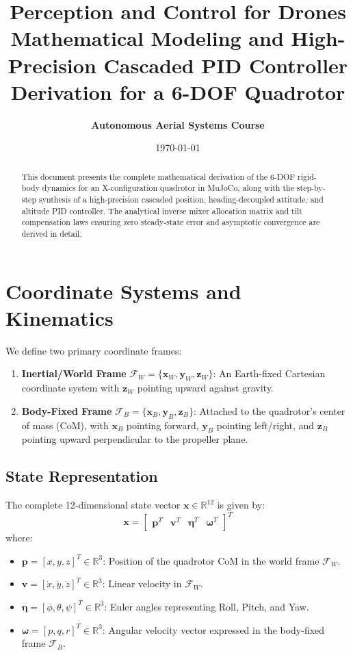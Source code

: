 \documentclass[11pt,a4paper]{article}
\title{\textbf{\Huge Perception and Control for Drones}\\[0.5em]
\Large Mathematical Modeling and High-Precision Cascaded PID Controller Derivation for a 6-DOF Quadrotor}
\author{\textbf{Autonomous Aerial Systems Course}}
\date{\today}
\begin{document}
\maketitle

\begin{abstract}
This document presents the complete mathematical derivation of the 6-DOF rigid-body dynamics for an X-configuration quadrotor in MuJoCo, along with the step-by-step synthesis of a high-precision cascaded position, heading-decoupled attitude, and altitude PID controller. The analytical inverse mixer allocation matrix and tilt compensation laws ensuring zero steady-state error and asymptotic convergence are derived in detail.
\end{abstract}

\tableofcontents
\newpage

\section{Coordinate Systems and Kinematics}

We define two primary coordinate frames:
\begin{enumerate}
    \item \textbf{Inertial/World Frame} $\mathcal{F}_W = \{\mathbf{x}_W, \mathbf{y}_W, \mathbf{z}_W\}$: An Earth-fixed Cartesian coordinate system with $\mathbf{z}_W$ pointing upward against gravity.
    \item \textbf{Body-Fixed Frame} $\mathcal{F}_B = \{\mathbf{x}_B, \mathbf{y}_B, \mathbf{z}_B\}$: Attached to the quadrotor's center of mass (CoM), with $\mathbf{x}_B$ pointing forward, $\mathbf{y}_B$ pointing left/right, and $\mathbf{z}_B$ pointing upward perpendicular to the propeller plane.
\end{enumerate}

\subsection{State Representation}
The complete 12-dimensional state vector $\mathbf{x} \in \mathbb{R}^{12}$ is given by:
\begin{equation}
\mathbf{x} = \begin{bmatrix} \mathbf{p}^T & \mathbf{v}^T & \boldsymbol{\eta}^T & \boldsymbol{\omega}^T \end{bmatrix}^T
\end{equation}
where:
\begin{itemize}
    \item $\mathbf{p} = [x, y, z]^T \in \mathbb{R}^3$: Position of the quadrotor CoM in the world frame $\mathcal{F}_W$.
    \item $\mathbf{v} = [\dot{x}, \dot{y}, \dot{z}]^T \in \mathbb{R}^3$: Linear velocity in $\mathcal{F}_W$.
    \item $\boldsymbol{\eta} = [\phi, \theta, \psi]^T \in \mathbb{R}^3$: Euler angles representing Roll, Pitch, and Yaw.
    \item $\boldsymbol{\omega} = [p, q, r]^T \in \mathbb{R}^3$: Angular velocity vector expressed in the body-fixed frame $\mathcal{F}_B$.
\end{itemize}
\end{document}
